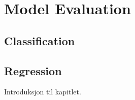 \documentclass[../../main.tex]{subfiles}
\begin{document}

\section{Model Evaluation}

\subsection{Classification}
\subsection{Regression}

Introduksjon til kapitlet.

\end{document}
